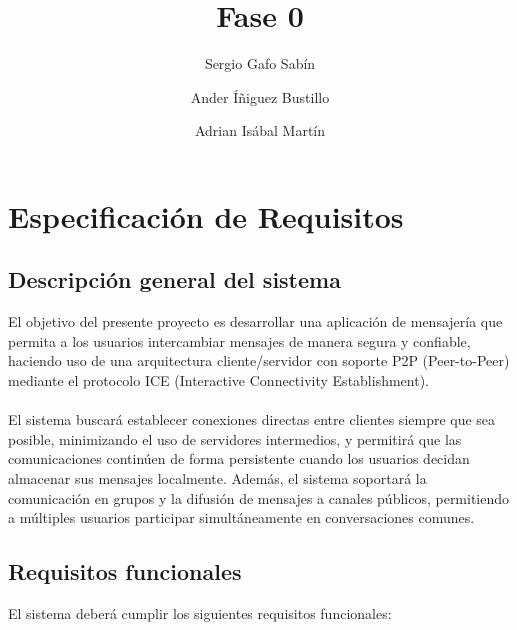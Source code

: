 \documentclass{article}
\title{Fase 0}
\author{Sergio Gafo Sabín \and Ander Íñiguez Bustillo \and Adrian Isábal Martín}
\begin{document}
    \maketitle %
    \newpage %
    \section{Especificación de Requisitos}

    \subsection{Descripción general del sistema}

    El objetivo del presente proyecto es desarrollar una aplicación de mensajería que permita a los usuarios intercambiar mensajes de manera segura y confiable, haciendo uso de una arquitectura cliente/servidor con soporte P2P (Peer-to-Peer) mediante el protocolo ICE (Interactive Connectivity Establishment).\\\\
El sistema buscará establecer conexiones directas entre clientes siempre que sea posible, minimizando el uso de servidores intermedios, y permitirá que las comunicaciones continúen de forma persistente cuando los usuarios decidan almacenar sus mensajes localmente. Además, el sistema soportará la comunicación en grupos y la difusión de mensajes a canales públicos, permitiendo a múltiples usuarios participar simultáneamente en conversaciones comunes.

  \subsection{Requisitos funcionales}

El sistema deberá cumplir los siguientes requisitos funcionales:
\end{document}
